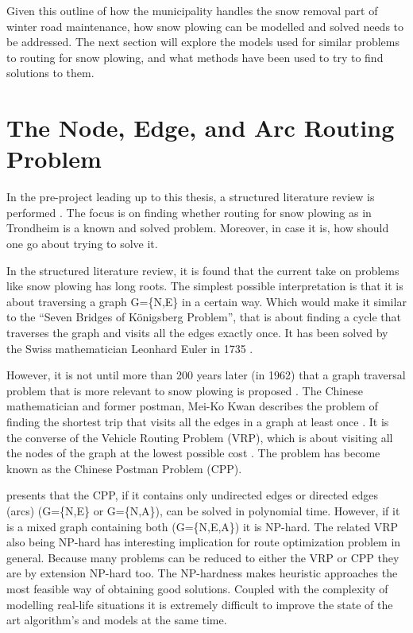 
Given this outline of how the municipality handles the snow removal part of winter road maintenance, how snow plowing can be modelled and solved needs to be addressed. The next section will explore the models used for similar problems to routing for snow plowing, and what methods have been used to try to find solutions to them.


\section{The Node, Edge, and Arc Routing Problem}
\label{the_nearp}

In the pre-project leading up to this thesis, a structured literature review is performed \citep{forprosjektet}. The focus is on finding whether routing for snow plowing as in Trondheim is a known and solved problem. Moreover, in case it is, how should one go about trying to solve it.

In the structured literature review, it is found that the current take on problems like snow plowing has long roots. The simplest possible interpretation is that it is about traversing a graph G=\{N,E\} in a certain way. Which would make it similar to the “Seven Bridges of Königsberg Problem”, that is about finding a cycle that traverses the graph and visits all the edges exactly once. It has been solved by the Swiss mathematician Leonhard Euler in 1735 \citep{eulerBridges}.

However, it is not until more than 200 years later (in 1962) that a graph traversal problem that is more relevant to snow plowing is proposed \citep{wohlk2008decade}. The Chinese mathematician and former postman, Mei-Ko Kwan describes the problem of finding the shortest trip that visits all the edges in a graph at least once \citep{meiKoKwanCPP}. It is the converse of the Vehicle Routing Problem (VRP), which is about visiting all the nodes of the graph at the lowest possible cost \citep{laporte1992vehicle}. The problem has become known as the Chinese Postman Problem (CPP).

\citet{wohlk2008decade} presents that the CPP, if it contains only undirected edges or directed edges (arcs) (G=\{N,E\} or G=\{N,A\}), can be solved in polynomial time. However, if it is a mixed graph containing both (G=\{N,E,A\}) it is NP-hard. The related VRP also being NP-hard has interesting implication for route optimization problem in general. Because many problems can be reduced to either the VRP or CPP they are by extension NP-hard too. The NP-hardness makes heuristic approaches the most feasible way of obtaining good solutions. Coupled with the complexity of modelling real-life situations it is extremely difficult to improve the state of the art algorithm's and models at the same time.

